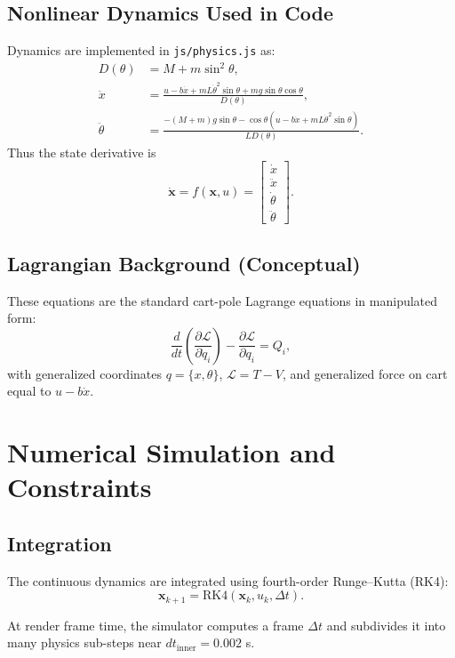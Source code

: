 \documentclass[11pt,a4paper]{article}
\newcommand{\state}{\mathbf{x}}
\begin{document}
\subsection{Nonlinear Dynamics Used in Code}
Dynamics are implemented in \texttt{js/physics.js} as:
\begin{align}
D(\theta) &= M + m\sin^2\theta, \\
\ddot{x} &= \frac{u - b\dot{x} + mL\dot{\theta}^2\sin\theta + mg\sin\theta\cos\theta}{D(\theta)}, \\
\ddot{\theta} &= \frac{-(M+m)g\sin\theta - \cos\theta\left(u - b\dot{x} + mL\dot{\theta}^2\sin\theta\right)}{L D(\theta)}.
\end{align}
Thus the state derivative is
\begin{equation}
\dot{\state} = f(\state, u) =
\begin{bmatrix}
\dot{x} \\
\ddot{x} \\
\dot{\theta} \\
\ddot{\theta}
\end{bmatrix}.
\end{equation}

\subsection{Lagrangian Background (Conceptual)}
These equations are the standard cart-pole Lagrange equations in manipulated form:
\begin{equation}
\frac{d}{dt}\left(\frac{\partial \mathcal{L}}{\partial \dot{q}_i}\right) -
\frac{\partial \mathcal{L}}{\partial q_i} = Q_i,
\end{equation}
with generalized coordinates $q=\{x,\theta\}$, $\mathcal{L}=T-V$, and generalized force on cart equal to $u-b\dot{x}$.

\section{Numerical Simulation and Constraints}
\subsection{Integration}
The continuous dynamics are integrated using fourth-order Runge--Kutta (RK4):
\begin{equation}
\state_{k+1} = \text{RK4}\!\left(\state_k,u_k,\Delta t\right).
\end{equation}

At render frame time, the simulator computes a frame $\Delta t$ and subdivides it into many physics sub-steps near $dt_{\text{inner}}=0.002$ s.
\end{document}
